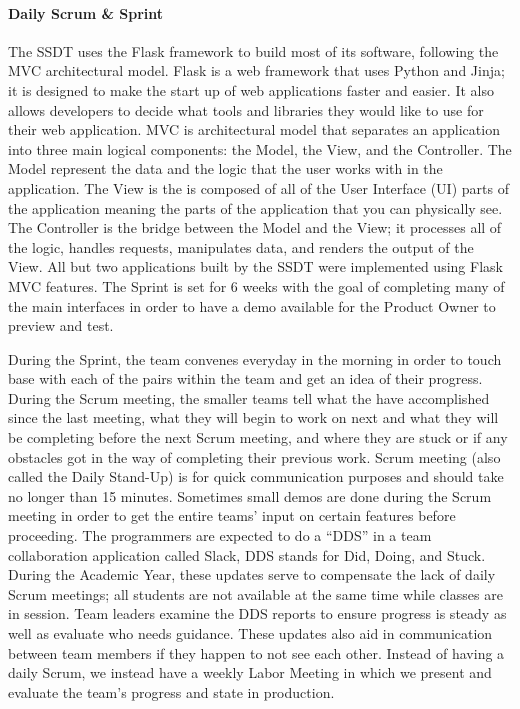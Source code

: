 \paragraph{ Daily Scrum \& Sprint}
The SSDT uses the Flask framework to build most of its software, following the MVC architectural model. Flask is a web framework that uses Python and Jinja; it is designed to make the start up of web applications faster and easier. It also allows developers to decide what tools and libraries they would like to use for their web application. MVC is architectural model that separates an application into three main logical components: the Model, the View, and the Controller. The Model represent the data and the logic that the user works with in the application. The View is the is composed of all of the User Interface (UI) parts of the application meaning the parts of the application that you can physically see. The Controller is the bridge between the Model and the View; it processes all of the logic, handles requests, manipulates data, and renders the output of the View. All but two applications built by the SSDT were implemented using Flask MVC features. The Sprint is set for 6 weeks with the goal of completing many of the main interfaces in order to have a demo available for the Product Owner to preview and test.

During the Sprint, the team convenes everyday in the morning in order to touch base with each of the pairs within the team and get an idea of their progress. During the Scrum meeting, the smaller teams tell what the have accomplished since the last meeting, what they will begin to work on next and what they will be completing before the next Scrum meeting, and where they are stuck or if any obstacles got in the way of completing their previous work. Scrum meeting (also called the Daily Stand-Up) is for quick communication purposes and should take no longer than 15 minutes. Sometimes small demos are done during the Scrum meeting in order to get the entire teams' input on certain features before proceeding. The programmers are expected to do a ``DDS'' in a team collaboration application called Slack, DDS stands for Did, Doing, and Stuck. During the Academic Year, these updates serve to compensate the lack of daily Scrum meetings; all students are not available at the same time while classes are in session. Team leaders examine the DDS reports to ensure progress is steady as well as evaluate who needs guidance. These updates also aid in communication between team members if they happen to not see each other. Instead of having a daily Scrum, we instead have a weekly Labor Meeting in which we present and evaluate the team's progress and state in production.

